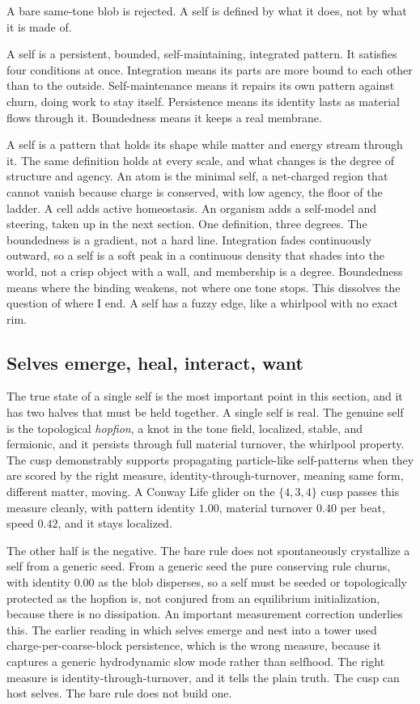 A bare same-tone blob is rejected. A self is defined by what it does, not by what it is made of.

\begin{definition}[A self]
A self is a persistent, bounded, self-maintaining, integrated pattern. It satisfies four conditions at once. Integration means its parts are more bound to each other than to the outside. Self-maintenance means it repairs its own pattern against churn, doing work to stay itself. Persistence means its identity lasts as material flows through it. Boundedness means it keeps a real membrane.
\end{definition}

A self is a pattern that holds its shape while matter and energy stream through it. The same definition holds at every scale, and what changes is the degree of structure and agency. An atom is the minimal self, a net-charged region that cannot vanish because charge is conserved, with low agency, the floor of the ladder. A cell adds active homeostasis. An organism adds a self-model and steering, taken up in the next section. One definition, three degrees. The boundedness is a gradient, not a hard line. Integration fades continuously outward, so a self is a soft peak in a continuous density that shades into the world, not a crisp object with a wall, and membership is a degree. Boundedness means where the binding weakens, not where one tone stops. This dissolves the question of where I end. A self has a fuzzy edge, like a whirlpool with no exact rim.

\subsection{Selves emerge, heal, interact, want}

The true state of a single self is the most important point in this section, and it has two halves that must be held together. A single self is real. The genuine self is the topological \emph{hopfion}, a knot in the tone field, localized, stable, and fermionic, and it persists through full material turnover, the whirlpool property. The cusp demonstrably supports propagating particle-like self-patterns when they are scored by the right measure, identity-through-turnover, meaning same form, different matter, moving. A Conway Life glider on the $\{4,3,4\}$ cusp passes this measure cleanly, with pattern identity $1.00$, material turnover $0.40$ per beat, speed $0.42$, and it stays localized.

The other half is the negative. The bare rule does not spontaneously crystallize a self from a generic seed. From a generic seed the pure conserving rule churns, with identity $0.00$ as the blob disperses, so a self must be seeded or topologically protected as the hopfion is, not conjured from an equilibrium initialization, because there is no dissipation. An important measurement correction underlies this. The earlier reading in which selves emerge and nest into a tower used charge-per-coarse-block persistence, which is the wrong measure, because it captures a generic hydrodynamic slow mode rather than selfhood. The right measure is identity-through-turnover, and it tells the plain truth. The cusp can host selves. The bare rule does not build one.

